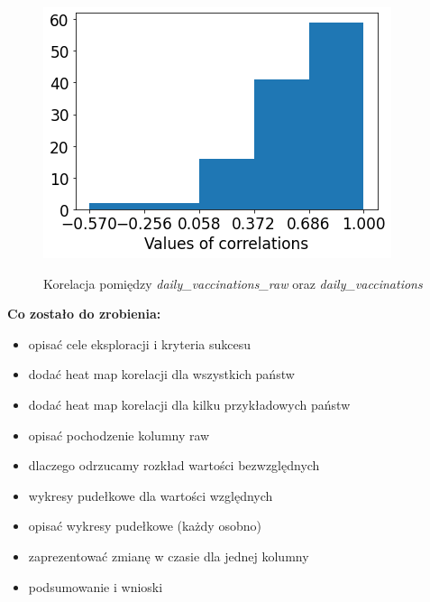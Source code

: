 \documentclass[12pt, oneside, openany]{article}
\begin{document}
\begin{figure}[h]
\centering
\includegraphics[scale=0.5]{../img/raw_corr.png} 
\label{Rys:kor}
\caption{Korelacja pomiędzy \textit{daily\_vaccinations\_raw} oraz \textit{daily\_vaccinations}}
\label{Rys:kor}
\end{figure}
\textbf{Co zostało do zrobienia:}
\begin{itemize}
\item opisać cele eksploracji i kryteria sukcesu
\item dodać heat map korelacji dla wszystkich państw
\item dodać heat map korelacji dla kilku przykładowych państw
\item opisać pochodzenie kolumny raw
\item dlaczego odrzucamy rozkład wartości bezwzględnych
\item wykresy pudełkowe dla wartości względnych
\item opisać wykresy pudełkowe (każdy osobno)
\item zaprezentować zmianę w czasie dla jednej kolumny
\item podsumowanie i wnioski
\end{itemize}




\end{document}
